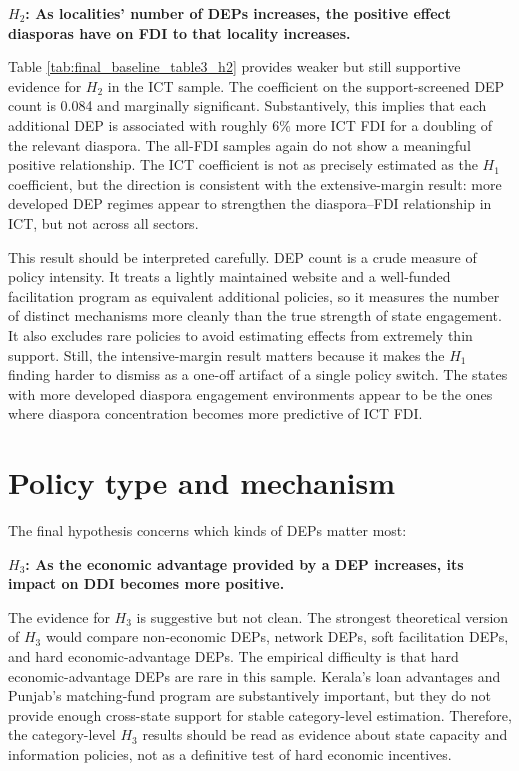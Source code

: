 \documentclass[doublespace,nopageskip]{UVAthesis}
\begin{document}
\textbf{$H_2$: As localities' number of DEPs increases, the positive effect diasporas have on FDI to that locality increases.}

Table \ref{tab:final_baseline_table3_h2} provides weaker but still supportive evidence for $H_2$ in the ICT sample. The coefficient on the support-screened DEP count is 0.084 and marginally significant. Substantively, this implies that each additional DEP is associated with roughly 6\% more ICT FDI for a doubling of the relevant diaspora. The all-FDI samples again do not show a meaningful positive relationship. The ICT coefficient is not as precisely estimated as the $H_1$ coefficient, but the direction is consistent with the extensive-margin result: more developed DEP regimes appear to strengthen the diaspora--FDI relationship in ICT, but not across all sectors.

This result should be interpreted carefully. DEP count is a crude measure of policy intensity. It treats a lightly maintained website and a well-funded facilitation program as equivalent additional policies, so it measures the number of distinct mechanisms more cleanly than the true strength of state engagement. It also excludes rare policies to avoid estimating effects from extremely thin support. Still, the intensive-margin result matters because it makes the $H_1$ finding harder to dismiss as a one-off artifact of a single policy switch. The states with more developed diaspora engagement environments appear to be the ones where diaspora concentration becomes more predictive of ICT FDI.

\section{Policy type and mechanism}

The final hypothesis concerns which kinds of DEPs matter most:

\textbf{$H_3$: As the economic advantage provided by a DEP increases, its impact on DDI becomes more positive.}

The evidence for $H_3$ is suggestive but not clean. The strongest theoretical version of $H_3$ would compare non-economic DEPs, network DEPs, soft facilitation DEPs, and hard economic-advantage DEPs. The empirical difficulty is that hard economic-advantage DEPs are rare in this sample. Kerala's loan advantages and Punjab's matching-fund program are substantively important, but they do not provide enough cross-state support for stable category-level estimation. Therefore, the category-level $H_3$ results should be read as evidence about state capacity and information policies, not as a definitive test of hard economic incentives.
\end{document}

